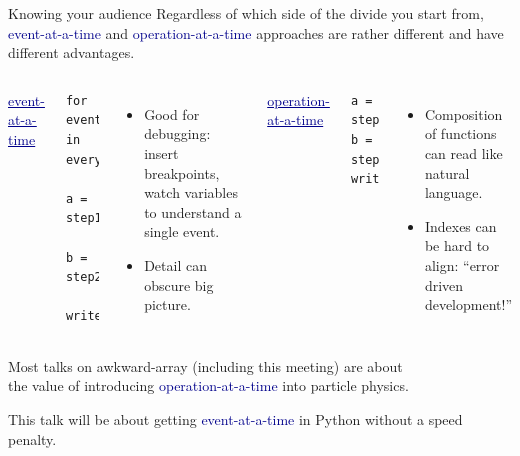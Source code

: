 \documentclass[aspectratio=169]{beamer}
\begin{document}
\begin{frame}[fragile]{Knowing your audience}
\large
\vspace{0.5 cm}
Regardless of which side of the divide you start from, \textcolor{darkblue}{event-at-a-time} and \textcolor{darkblue}{operation-at-a-time} approaches are rather different and have different advantages.

\vspace{0.25 cm}
\begin{columns}[t]
\textcolor{darkblue}{\underline{event-at-a-time}}

{\small
\begin{verbatim}
for event in everything:
    a = step1(event)
    b = step2(a)
    write_one(b)
\end{verbatim}
}

\begin{itemize}
\item<2-> Good for debugging: insert breakpoints, watch variables to understand a single event.
\item<3-> Detail can obscure big picture.
\end{itemize}

\textcolor{darkblue}{\underline{operation-at-a-time}}

{\small
\begin{verbatim}
a = step1(everything)
b = step2(a)
write_all(b)

\end{verbatim}
}

\begin{itemize}
\item<4-> Composition of functions can read like natural language.
\item<5-> Indexes can be hard to align: ``error driven development!''
\end{itemize}

\end{columns}
\end{frame}

\begin{frame}{}
\vspace{1 cm}
\large
\begin{center}
Most talks on awkward-array (including this meeting) are about \\ the value of introducing \textcolor{darkblue}{operation-at-a-time} into particle physics.

\vspace{1 cm}
This talk will be about getting \textcolor{darkblue}{event-at-a-time} in Python without a speed penalty.

\vspace{0.15 cm}
\end{center}
\end{frame}
\end{document}
